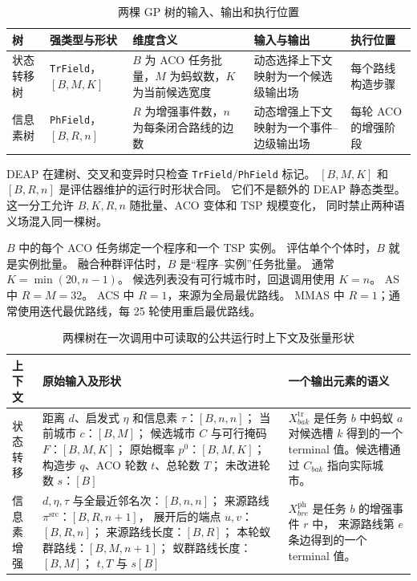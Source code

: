 \documentclass[letterpaper,journal]{IEEEtran}
\begin{document}
\begin{table}[t]
\caption{两棵 GP 树的输入、输出和执行位置}
\label{tab:strong-type-zh}
\centering
\footnotesize
\renewcommand{\arraystretch}{1.15}
\begin{tabular}{L{21mm}L{23mm}L{40mm}L{40mm}L{36mm}}
\toprule
树 & 强类型与形状 & 维度含义 & 输入与输出 & 执行位置\\
\midrule
状态转移树 &
\texttt{TrField}，\([B,M,K]\) &
\(B\) 为 ACO 任务批量，\(M\) 为蚂蚁数，\(K\) 为当前候选宽度 &
动态选择上下文映射为一个候选级输出场 &
每个路线构造步骤\\
信息素树 &
\texttt{PhField}，\([B,R,n]\) &
\(R\) 为增强事件数，\(n\) 为每条闭合路线的边数 &
动态增强上下文映射为一个事件--边级输出场 &
每轮 ACO 的增强阶段\\
\bottomrule
\end{tabular}
\end{table}

DEAP 在建树、交叉和变异时只检查
\texttt{TrField}/\texttt{PhField} 标记。
\([B,M,K]\) 和 \([B,R,n]\) 是评估器维护的运行时形状合同。
它们不是额外的 DEAP 静态类型。
这一分工允许 \(B,K,R,n\) 随批量、ACO 变体和 TSP 规模变化，
同时禁止两种语义场混入同一棵树。

\(B\) 中的每个 ACO 任务绑定一个程序和一个 TSP 实例。
评估单个个体时，\(B\) 就是实例批量。
融合种群评估时，\(B\) 是“程序--实例”任务批量。
通常 \(K=\min(20,n-1)\)。
候选列表没有可行城市时，回退调用使用 \(K=n\)。
AS 中 \(R=M=32\)。
ACS 中 \(R=1\)，来源为全局最优路线。
MMAS 中 \(R=1\)；通常使用迭代最优路线，每 25 轮使用重启最优路线。

\begin{table}[t]
\caption{两棵树在一次调用中可读取的公共运行时上下文及张量形状}
\label{tab:runtime-context-zh}
\centering
\footnotesize
\renewcommand{\arraystretch}{1.15}
\setlength{\tabcolsep}{4pt}
\begin{tabular}{L{25mm}L{67mm}L{77mm}}
\toprule
上下文 & 原始输入及形状 & 一个输出元素的语义\\
\midrule
状态转移 &
距离 \(d\)、启发式 \(\eta\) 和信息素 \(\tau\)：\([B,n,n]\)；
当前城市 \(c\)：\([B,M]\)；
候选城市 \(C\) 与可行掩码 \(F\)：\([B,M,K]\)；
原始概率 \(p^0\)：\([B,M,K]\)；
构造步 \(q\)、ACO 轮数 \(t\)、总轮数 \(T\)；
未改进轮数 \(s\)：\([B]\) &
\(X^{\mathrm{tr}}_{bak}\) 是任务 \(b\) 中蚂蚁 \(a\) 对候选槽 \(k\)
得到的一个 terminal 值。候选槽通过 \(C_{bak}\) 指向实际城市。\\
信息素增强 &
\(d,\eta,\tau\) 与全最近邻名次：\([B,n,n]\)；
来源路线 \(\pi^{\mathrm{src}}\)：\([B,R,n+1]\)，
展开后的端点 \(u,v\)：\([B,R,n]\)；
来源路线长度：\([B,R]\)；
本轮蚁群路线：\([B,M,n+1]\)；
蚁群路线长度：\([B,M]\)；
\(t,T\) 与 \(s[B]\) &
\(X^{\mathrm{ph}}_{bre}\) 是任务 \(b\) 的增强事件 \(r\) 中，
来源路线第 \(e\) 条边得到的一个 terminal 值。\\
\bottomrule
\end{tabular}
\end{table}
\end{document}
